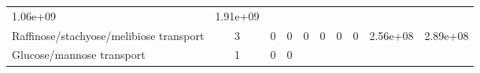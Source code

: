 \documentclass[]{article}
\begin{document}
\begin{longtable}[]{@{}lccccccccc@{}}
\begin{minipage}[t]{0.08\columnwidth}
1.06e+09\strut
\end{minipage} & \begin{minipage}[t]{0.08\columnwidth}\centering\strut
1.91e+09\strut
\end{minipage}\tabularnewline
\begin{minipage}[t]{0.07\columnwidth}\raggedright\strut
Raffinose/stachyose/melibiose transport\strut
\end{minipage} & \begin{minipage}[t]{0.06\columnwidth}\centering\strut
3\strut
\end{minipage} & \begin{minipage}[t]{0.08\columnwidth}\centering\strut
0\strut
\end{minipage} & \begin{minipage}[t]{0.08\columnwidth}\centering\strut
0\strut
\end{minipage} & \begin{minipage}[t]{0.08\columnwidth}\centering\strut
0\strut
\end{minipage} & \begin{minipage}[t]{0.08\columnwidth}\centering\strut
0\strut
\end{minipage} & \begin{minipage}[t]{0.08\columnwidth}\centering\strut
0\strut
\end{minipage} & \begin{minipage}[t]{0.08\columnwidth}\centering\strut
0\strut
\end{minipage} & \begin{minipage}[t]{0.08\columnwidth}\centering\strut
2.56e+08\strut
\end{minipage} & \begin{minipage}[t]{0.08\columnwidth}\centering\strut
2.89e+08\strut
\end{minipage}\tabularnewline
\begin{minipage}[t]{0.07\columnwidth}\raggedright\strut
Glucose/mannose transport\strut
\end{minipage} & \begin{minipage}[t]{0.06\columnwidth}\centering\strut
1\strut
\end{minipage} & \begin{minipage}[t]{0.08\columnwidth}\centering\strut
0\strut
\end{minipage} & \begin{minipage}[t]{0.08\columnwidth}\centering\strut
0\strut
\end{minipage} & \begin{minipage}[t]{0.08\columnwidth}\centering\strut

\end{minipage}
\end{longtable}
\end{document}
